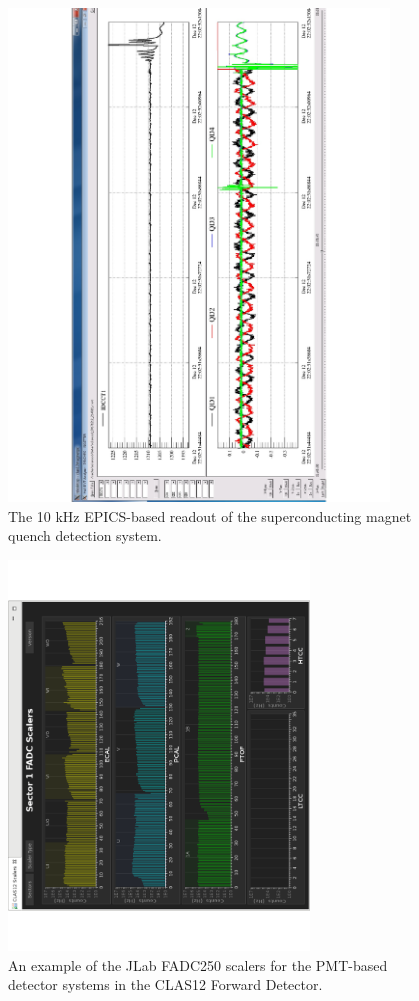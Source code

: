 \begin{figure}[t]\centering
	\includegraphics[width=0.9\textwidth]{img/tordaq}
	\caption{The 10 kHz EPICS-based readout of the superconducting magnet quench detection system.}
	\label{fig:tordaq}
\end{figure}

\begin{figure}[htbp]\centering
	\includegraphics[width=8cm]{img/fd-scalers}
	\caption{An example of the JLab FADC250 scalers for the PMT-based detector systems in the CLAS12
          Forward Detector.}
	\label{fig:jlabscalers}
\end{figure}

